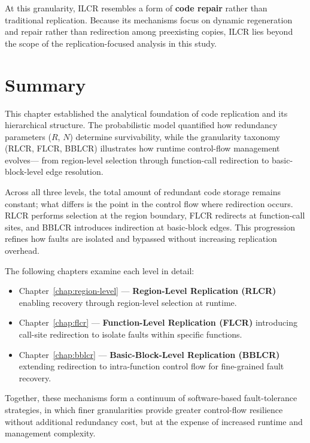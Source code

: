 At this granularity, ILCR resembles a form of \textbf{code repair} rather than
traditional replication. Because its mechanisms focus on dynamic regeneration
and repair rather than redirection among preexisting copies, ILCR lies beyond
the scope of the replication-focused analysis in this study.

\section{Summary}
\label{sec:replication-summary}

This chapter established the analytical foundation of code replication and its
hierarchical structure. The probabilistic model quantified how redundancy
parameters ($R$, $N$) determine survivability, while the granularity taxonomy
(RLCR, FLCR, BBLCR) illustrates how runtime control-flow management evolves—
from region-level selection through function-call redirection to basic-block-level
edge resolution.

Across all three levels, the total amount of redundant code storage remains
constant; what differs is the point in the control flow where redirection
occurs. RLCR performs selection at the region boundary, FLCR redirects at
function-call sites, and BBLCR introduces indirection at basic-block edges.
This progression refines how faults are isolated and bypassed without increasing
replication overhead.

The following chapters examine each level in detail:
\begin{itemize}
  \item Chapter~\ref{chap:region-level} — \textbf{Region-Level Replication (RLCR)}
        enabling recovery through region-level selection at runtime.
  \item Chapter~\ref{chap:flcr} — \textbf{Function-Level Replication (FLCR)}
        introducing call-site redirection to isolate faults within specific
        functions.
  \item Chapter~\ref{chap:bblcr} — \textbf{Basic-Block-Level Replication (BBLCR)}
        extending redirection to intra-function control flow for fine-grained
        fault recovery.
\end{itemize}

Together, these mechanisms form a continuum of software-based fault-tolerance
strategies, in which finer granularities provide greater control-flow resilience
without additional redundancy cost, but at the expense of increased runtime
and management complexity.